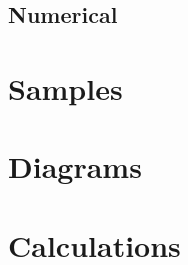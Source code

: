 \documentclass[11pt]{article}
\begin{document}
\subsection{Numerical}






\section{Samples}


\section{Diagrams}


\section{Calculations}

\end{document}
